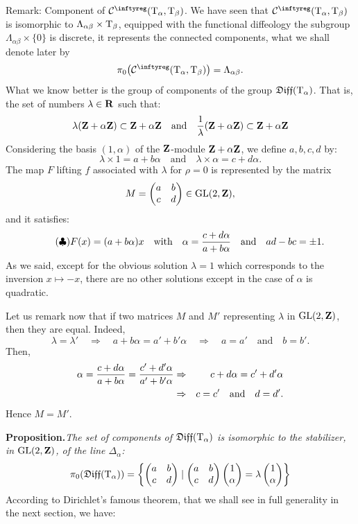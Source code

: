 \begin{Article}{Remark: Component of $\Cinfty(\Torus_\alpha,\Torus_\beta)$.}{}
  We have seen that $\Cinfty(\Torus_\alpha,\Torus_\beta)$ is isomorphic to $\Lambda_{\alpha\beta} \times \mathrm{T}_\beta$,
  equipped with the functional diffeology the subgroup $\Lambda_{\alpha\beta} \times \{0\}$ is discrete,
  it represents the connected components,
  what we shall denote later by
  $$%
    \pi_0\big(\Cinfty(\Torus_\alpha,\Torus_\beta)\big) = \Lambda_{\alpha\beta}.
    $$%
  What we know better is the group of components of the group $\mathfrak{Diff}(\mathrm{T}_\alpha)$.
  That is,
  the set of numbers $\lambda \in \mathbf{R}$ such that:
  $$%
    \lambda (\ZZ + \alpha \ZZ) \subset \ZZ + \alpha \ZZ
    \quad \text{and} \quad
    {1 \over \lambda} (\ZZ + \alpha \ZZ) \subset \ZZ + \alpha \ZZ
    $$%
  Considering the basis $(1, \alpha)$ of the $\mathbf{Z}$-module $\mathbf{Z} + \alpha \mathbf{Z}$,
  we define $a,b,c,d$ by:
  $$%
    \lambda \times 1 = a + b \alpha
    \quad \text{and} \quad
    \lambda \times \alpha = c + d \alpha.
    $$%
  The map $F$ lifting $f$ associated with $\lambda$ for $\rho = 0$ is represented by the matrix
  $$%
    M = \Vector{a & b \\ c & d} \in \GL(2,\ZZ),
    $$%
  and it satisfies:
  \begin{equation} \tag{$\clubsuit$}
    F(x) = (a + b \alpha)x
    \quad \text{with} \quad
    \alpha = {c + d \alpha \over a + b \alpha}
    \quad \text{and} \quad
    ad - bc = \pm 1.
  \end{equation}
  As we said,
  except for the obvious solution $\lambda = 1$ which corresponds to the inversion $x \mapsto -x$,
  there are no other solutions except in the case of $\alpha$ is quadratic.
  
  Let us remark now that if two matrices $M$ and $M'$ representing $\lambda$ in $\mathrm{GL}(2,\mathbf{Z})$, then they are equal.
  Indeed,
  $$%
    \lambda = \lambda' \quad \Rightarrow \quad a + b \alpha = a' + b' \alpha
    \quad \Rightarrow \quad a = a' \quad \text{and} \quad b=b'.
    $$%
  Then,
  \begin{eqnarray*}
    \alpha = {c + d \alpha \over a + b \alpha} = {c' + d' \alpha \over a' + b' \alpha}
    & \Rightarrow & c + d \alpha = c' + d' \alpha \\
    & \Rightarrow & c = c' \quad \text{and} \quad d= d'.
  \end{eqnarray*}
  Hence $M = M'$.
  
  \textbf{Proposition.}{\itshape The set of components of $\mathfrak{Diff}(\mathrm{T}_\alpha)$ is isomorphic to the stabilizer,
  in $\mathrm{GL}(2,\mathbf{Z})$,
  of the line $\Delta_\alpha$:
  $$%
    \pi_0(\Diff(\Torus_\alpha)) = \left\{ \Vector{a & b \\ c & d} \mid  \Vector{a & b \\ c & d} \Vector{1 \\ \alpha} = \lambda \Vector{1 \\ \alpha} \right\}
    $$%
  }
  According to Dirichlet's famous theorem,
  that we shall see in full generality in the next section,
  we have:
  

\end{Article}
